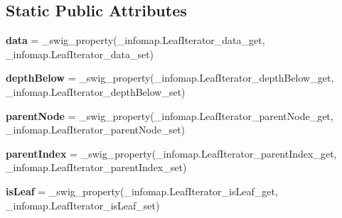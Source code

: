 \subsection*{Static Public Attributes}
\begin{DoxyCompactItemize}
\item 
\mbox{\label{classdsmacc_1_1graph_1_1infomap_1_1infomap_1_1LeafIterator_ae399a21071dbdd3010157f44e9f4fe5d}} 
{\bfseries data} = \+\_\+swig\+\_\+property(\+\_\+infomap.\+Leaf\+Iterator\+\_\+data\+\_\+get, \+\_\+infomap.\+Leaf\+Iterator\+\_\+data\+\_\+set)
\item 
\mbox{\label{classdsmacc_1_1graph_1_1infomap_1_1infomap_1_1LeafIterator_a8a5deef2fddab410a79bc3aa863d6450}} 
{\bfseries depth\+Below} = \+\_\+swig\+\_\+property(\+\_\+infomap.\+Leaf\+Iterator\+\_\+depth\+Below\+\_\+get, \+\_\+infomap.\+Leaf\+Iterator\+\_\+depth\+Below\+\_\+set)
\item 
\mbox{\label{classdsmacc_1_1graph_1_1infomap_1_1infomap_1_1LeafIterator_a874812d7db1273c206b8006628a27a1b}} 
{\bfseries parent\+Node} = \+\_\+swig\+\_\+property(\+\_\+infomap.\+Leaf\+Iterator\+\_\+parent\+Node\+\_\+get, \+\_\+infomap.\+Leaf\+Iterator\+\_\+parent\+Node\+\_\+set)
\item 
\mbox{\label{classdsmacc_1_1graph_1_1infomap_1_1infomap_1_1LeafIterator_a9319a7a8be11fe5a540aec32595eb0ef}} 
{\bfseries parent\+Index} = \+\_\+swig\+\_\+property(\+\_\+infomap.\+Leaf\+Iterator\+\_\+parent\+Index\+\_\+get, \+\_\+infomap.\+Leaf\+Iterator\+\_\+parent\+Index\+\_\+set)
\item 
\mbox{\label{classdsmacc_1_1graph_1_1infomap_1_1infomap_1_1LeafIterator_a3955a5537f8e3efa3e534fb994c3719a}} 
{\bfseries is\+Leaf} = \+\_\+swig\+\_\+property(\+\_\+infomap.\+Leaf\+Iterator\+\_\+is\+Leaf\+\_\+get, \+\_\+infomap.\+Leaf\+Iterator\+\_\+is\+Leaf\+\_\+set)
\item 
\mbox{\label{classdsmacc_1_1graph_1_1infomap_1_1infomap_1_1LeafIterator_a6ddde216422d7d69f059985f14b51d4f}} 

\end{DoxyCompactItemize}
